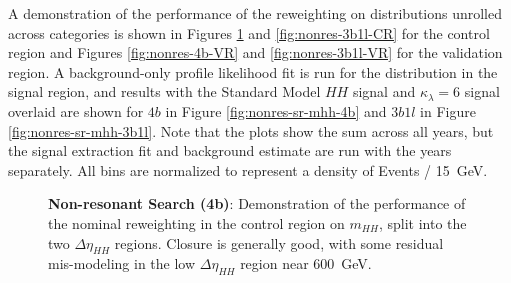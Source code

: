 A demonstration of the performance of the reweighting on distributions unrolled across categories is shown 
in Figures \ref{fig:nonres-4b-CR} and \ref{fig:nonres-3b1l-CR} for the control region and 
Figures \ref{fig:nonres-4b-VR} and \ref{fig:nonres-3b1l-VR} for 
the validation region. A background-only profile likelihood fit is run for the distribution in the signal 
region, and results with the Standard Model $HH$ signal and $\kappa_{\lambda}=6$ signal overlaid are shown for $4b$ in Figure \ref{fig:nonres-sr-mhh-4b} and $3b1l$ in Figure \ref{fig:nonres-sr-mhh-3b1l}. Note that 
the plots show the sum across all years, but the signal extraction fit and background estimate are run with the 
years separately. All bins are normalized to represent a density of Events / \SI{15}{\GeV}.

\begin{figure}[ht]
  \centering
  \caption{\label{fig:nonres-4b-CR} \textbf{Non-resonant Search (4b)}: Demonstration of the performance of the nominal reweighting in the control region on $m_{HH}$, split into the two $\Delta\eta_{HH}$ regions. Closure is generally good, 
  with some residual mis-modeling in the low $\Delta\eta_{HH}$ region near \SI{600}{\GeV}.}
\end{figure}

